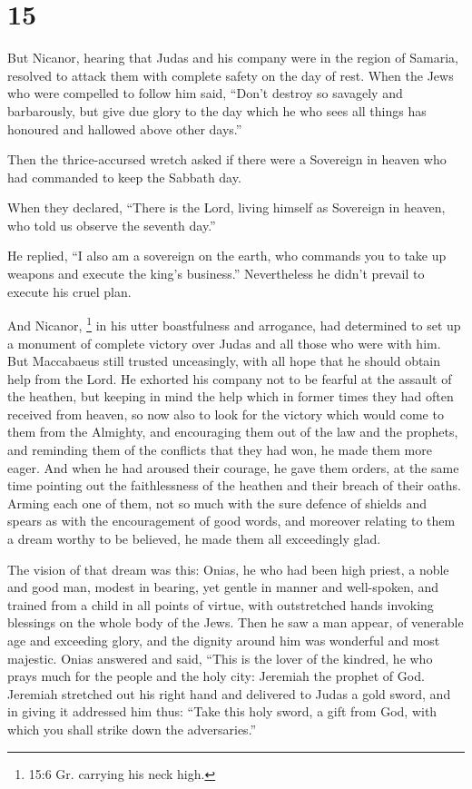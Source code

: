 \hypertarget{section-14}{%
\section{15}\label{section-14}}

 But Nicanor, hearing that Judas and his company were in the
region of Samaria, resolved to attack them with complete safety on the
day of rest.  When the Jews who were compelled to follow him
said, ``Don't destroy so savagely and barbarously, but give due glory to
the day which he who sees all things has honoured and hallowed above
other days.''

 Then the thrice-accursed wretch asked if there were a
Sovereign in heaven who had commanded to keep the Sabbath day.

 When they declared, ``There is the Lord, living himself as
Sovereign in heaven, who told us observe the seventh day.''

 He replied, ``I also am a sovereign on the earth, who
commands you to take up weapons and execute the king's business.''
Nevertheless he didn't prevail to execute his cruel plan.

 And Nicanor, \footnote{15:6 Gr. carrying his neck high.} in
his utter boastfulness and arrogance, had determined to set up a
monument of complete victory over Judas and all those who were with him.
 But Maccabaeus still trusted unceasingly, with all hope
that he should obtain help from the Lord.  He exhorted his
company not to be fearful at the assault of the heathen, but keeping in
mind the help which in former times they had often received from heaven,
so now also to look for the victory which would come to them from the
Almighty,  and encouraging them out of the law and the
prophets, and reminding them of the conflicts that they had won, he made
them more eager.  And when he had aroused their courage, he
gave them orders, at the same time pointing out the faithlessness of the
heathen and their breach of their oaths.  Arming each one
of them, not so much with the sure defence of shields and spears as with
the encouragement of good words, and moreover relating to them a dream
worthy to be believed, he made them all exceedingly glad.

 The vision of that dream was this: Onias, he who had been
high priest, a noble and good man, modest in bearing, yet gentle in
manner and well-spoken, and trained from a child in all points of
virtue, with outstretched hands invoking blessings on the whole body of
the Jews.  Then he saw a man appear, of venerable age and
exceeding glory, and the dignity around him was wonderful and most
majestic.  Onias answered and said, ``This is the lover of
the kindred, he who prays much for the people and the holy city:
Jeremiah the prophet of God.  Jeremiah stretched out his
right hand and delivered to Judas a gold sword, and in giving it
addressed him thus:  ``Take this holy sword, a gift from
God, with which you shall strike down the adversaries.''

